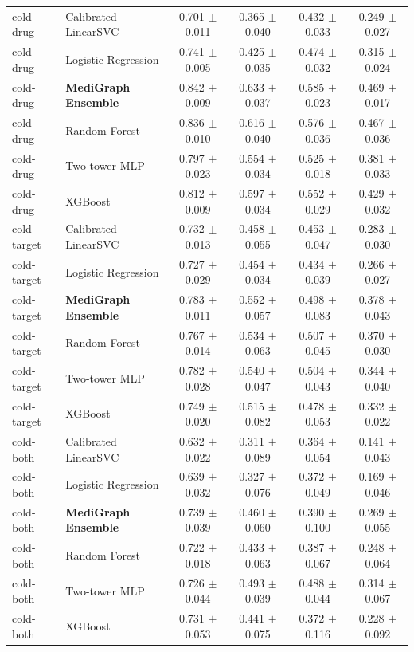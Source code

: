 \begin{table}[t]
\begin{tabular}{llcccc}
\hline
cold-drug & Calibrated LinearSVC & 0.701 $\pm$ 0.011 & 0.365 $\pm$ 0.040 & 0.432 $\pm$ 0.033 & 0.249 $\pm$ 0.027 \\
cold-drug & Logistic Regression & 0.741 $\pm$ 0.005 & 0.425 $\pm$ 0.035 & 0.474 $\pm$ 0.032 & 0.315 $\pm$ 0.024 \\
cold-drug & \textbf{MediGraph Ensemble} & 0.842 $\pm$ 0.009 & 0.633 $\pm$ 0.037 & 0.585 $\pm$ 0.023 & 0.469 $\pm$ 0.017 \\
cold-drug & Random Forest & 0.836 $\pm$ 0.010 & 0.616 $\pm$ 0.040 & 0.576 $\pm$ 0.036 & 0.467 $\pm$ 0.036 \\
cold-drug & Two-tower MLP & 0.797 $\pm$ 0.023 & 0.554 $\pm$ 0.034 & 0.525 $\pm$ 0.018 & 0.381 $\pm$ 0.033 \\
cold-drug & XGBoost & 0.812 $\pm$ 0.009 & 0.597 $\pm$ 0.034 & 0.552 $\pm$ 0.029 & 0.429 $\pm$ 0.032 \\
\hline
cold-target & Calibrated LinearSVC & 0.732 $\pm$ 0.013 & 0.458 $\pm$ 0.055 & 0.453 $\pm$ 0.047 & 0.283 $\pm$ 0.030 \\
cold-target & Logistic Regression & 0.727 $\pm$ 0.029 & 0.454 $\pm$ 0.034 & 0.434 $\pm$ 0.039 & 0.266 $\pm$ 0.027 \\
cold-target & \textbf{MediGraph Ensemble} & 0.783 $\pm$ 0.011 & 0.552 $\pm$ 0.057 & 0.498 $\pm$ 0.083 & 0.378 $\pm$ 0.043 \\
cold-target & Random Forest & 0.767 $\pm$ 0.014 & 0.534 $\pm$ 0.063 & 0.507 $\pm$ 0.045 & 0.370 $\pm$ 0.030 \\
cold-target & Two-tower MLP & 0.782 $\pm$ 0.028 & 0.540 $\pm$ 0.047 & 0.504 $\pm$ 0.043 & 0.344 $\pm$ 0.040 \\
cold-target & XGBoost & 0.749 $\pm$ 0.020 & 0.515 $\pm$ 0.082 & 0.478 $\pm$ 0.053 & 0.332 $\pm$ 0.022 \\
\hline
cold-both & Calibrated LinearSVC & 0.632 $\pm$ 0.022 & 0.311 $\pm$ 0.089 & 0.364 $\pm$ 0.054 & 0.141 $\pm$ 0.043 \\
cold-both & Logistic Regression & 0.639 $\pm$ 0.032 & 0.327 $\pm$ 0.076 & 0.372 $\pm$ 0.049 & 0.169 $\pm$ 0.046 \\
cold-both & \textbf{MediGraph Ensemble} & 0.739 $\pm$ 0.039 & 0.460 $\pm$ 0.060 & 0.390 $\pm$ 0.100 & 0.269 $\pm$ 0.055 \\
cold-both & Random Forest & 0.722 $\pm$ 0.018 & 0.433 $\pm$ 0.063 & 0.387 $\pm$ 0.067 & 0.248 $\pm$ 0.064 \\
cold-both & Two-tower MLP & 0.726 $\pm$ 0.044 & 0.493 $\pm$ 0.039 & 0.488 $\pm$ 0.044 & 0.314 $\pm$ 0.067 \\
cold-both & XGBoost & 0.731 $\pm$ 0.053 & 0.441 $\pm$ 0.075 & 0.372 $\pm$ 0.116 & 0.228 $\pm$ 0.092 \\
\hline
\end{tabular}
\end{table}
